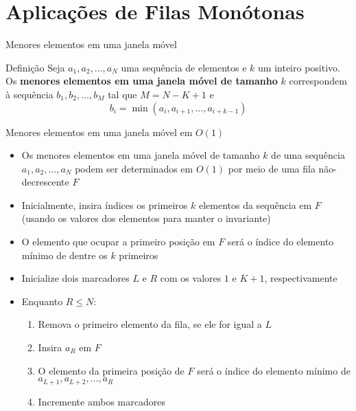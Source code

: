 \section{Aplicações de Filas Monótonas}

\begin{frame}[fragile]{Menores elementos em uma janela móvel}

    \begin{block}{Definição}
        Seja $a_1, a_2, \ldots, a_N$ uma sequência de elementos e $k$ um inteiro positivo. Os \textbf{menores elementos em uma janela móvel de tamanho} $k$ correspondem à sequência $b_1, b_2, \ldots, b_M$ tal que
$M = N - K + 1$ e
$$
        b_i = \min(a_i, a_{i + 1}, \ldots, a_{i + k - 1})
$$
    \end{block}

\end{frame}

\begin{frame}[fragile]{Menores elementos em uma janela móvel em $O(1)$}

    \begin{itemize}
        \item Os menores elementos em uma janela móvel de tamanho $k$ de uma sequência $a_1, a_2, \ldots, a_N$ podem ser determinados em $O(1)$ por meio de uma fila não-decrescente $F$

        \item Inicialmente, insira índices os primeiros $k$ elementos da sequência em $F$ (usando os
            valores dos elementos para manter o invariante)

        \item O elemento que ocupar a primeiro posição em $F$ será o índice do elemento mínimo de dentre 
            os $k$ primeiros

        \item Inicialize dois marcadores $L$ e $R$ com os valores $1$ e $K + 1$, respectivamente

        \item  Enquanto $R \leq N$:
            \begin{enumerate}
                \item Remova o primeiro elemento da fila, se ele for igual a $L$
                \item Insira $a_R$ em $F$
                \item O elemento da primeira posição de $F$ será o índice do elemento mínimo de 
                    $a_{L + 1}, a_{L + 2}, \ldots, a_R$
                \item Incremente ambos marcadores
            \end{enumerate}
    \end{itemize}
\end{frame}

